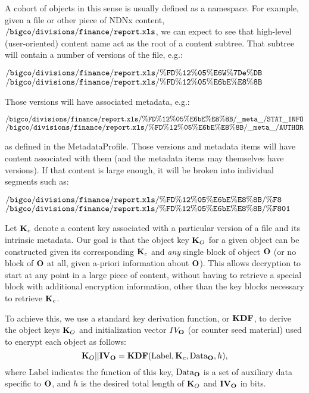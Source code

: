 A cohort of objects in this sense is usually defined as a
namespace. For example, given a file or other piece of NDNx content,
$\ndnxpath{/bigco/divisions/finance/report.xls}$, we can expect to see
that high-level (user-oriented) content name act as the root of a
content subtree. That subtree will contain a number of versions of the
file, e.g.:
\begin{flushleft}
  $\ndnxpath{/bigco/divisions/finance/report.xls/\%FD\%12\%05\%E6W\%7De\%DB}$ \\ $\ndnxpath{/bigco/divisions/finance/report.xls/\%FD\%12\%05\%E6bE\%E8\%8B}$
\end{flushleft}
Those versions will have associated metadata, e.g.:
\begin{flushleft}
  $\ndnxpath{/bigco/divisions/finance/report.xls/\%FD\%12\%05\%E6bE\%E8\%8B/\_meta\_/STAT\_INFO}$ \\ $\ndnxpath{/bigco/divisions/finance/report.xls/\%FD\%12\%05\%E6bE\%E8\%8B/\_meta\_/AUTHOR}$
\end{flushleft}
as defined in the MetadataProfile. Those versions and metadata items
will have content associated with them (and the metadata items may
themselves have versions). If that content is large enough, it will be
broken into individual segments such as:
\begin{flushleft}
  $\ndnxpath{/bigco/divisions/finance/report.xls/\%FD\%12\%05\%E6bE\%E8\%8B/\%F8}$ \\ $\ndnxpath{/bigco/divisions/finance/report.xls/\%FD\%12\%05\%E6bE\%E8\%8B/\%F801}$
\end{flushleft}
Let ${\textbf{K}_c}$ denote a content key associated with a particular version of
a file and its intrinsic metadata. Our goal is that the object key
${\textbf{K}_O}$ for a given object can be constructed given its corresponding
${\textbf{K}_c}$ and \emph{any} single block of object ${\textbf{O}}$ (or no block of
${\textbf{O}}$ at all, given a-priori information about ${\textbf{O}}$). This allows
decryption to start at any point in a large piece of content, without
having to retrieve a special block with additional encryption
information, other than the key blocks necessary to retrieve ${\textbf{K}_c}$.

To achieve this, we use a standard key derivation function, or ${\textbf{KDF}}$,
to derive the object keys ${\textbf{K}_O}$ and initialization vector $IV_{{\textbf{O}}}$
(or counter seed material) used to encrypt each object as follows:
$${\textbf{K}_O} || {\textbf{IV}}_{{\textbf{O}}} = {\textbf{KDF}}(\mbox{Label}, {\textbf{K}_c}, \mbox{Data}_{{\textbf{O}}}, h),$$
where $\mbox{Label}$ indicates the function of this key,
$\mbox{Data}_{{\textbf{O}}}$ is a set of auxiliary data specific to ${\textbf{O}}$,
and $h$ is the desired total length of ${\textbf{K}_O}$ and ${\textbf{IV}}_{{\textbf{O}}}$ in bits.

